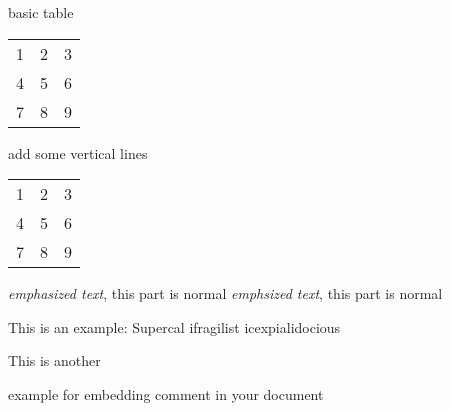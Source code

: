 \documentclass{article}
\begin{document}
basic table
\begin{tabular}{ l c r }
    1 & 2 & 3 \\
    4 & 5 & 6 \\
    7 & 8 & 9 \\
\end{tabular}

add some vertical lines
\begin{tabular}{ l | c || r }
    1 & 2 & 3 \\
    4 & 5 & 6 \\
    7 & 8 & 9 \\
\end{tabular}

\emph{emphasized text}, this part is normal %
{\em emphsized text}, this part is normal %


This is an %
example: Supercal%
ifragilist%
icexpialidocious

This is another
\begin{comment}
rather stupid,
but helpful
\end{comment}
example for embedding
comment in your document
\end{document}

